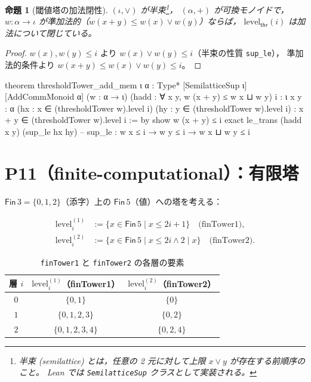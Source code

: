 \documentclass[a4paper,11pt]{ltjsarticle}
\theoremstyle{definition}
\theoremstyle{plain}
\newtheorem{proposition}[definition]{命題}
\theoremstyle{remark}
\newcommand{\lev}{\mathrm{level}}
\begin{document}
\begin{proposition}[閾値塔の加法閉性]\label{prop:threshold-add}
$(\iota, \vee)$ が半束\footnote{%
  半束 (semilattice) とは，任意の 2 元に対して上限 $x \vee y$ が存在する前順序のこと。
  Lean では \texttt{SemilatticeSup} クラスとして実装される。}，
$(\alpha, +)$ が可換モノイドで，
$w : \alpha \to \iota$ が準加法的（$w(x+y) \leq w(x) \vee w(y)$）ならば，
$\lev_{\mathsf{thr}}(i)$ は加法について閉じている。
\end{proposition}
\begin{proof}
$w(x), w(y) \leq i$ より $w(x) \vee w(y) \leq i$（半束の性質 \texttt{sup\_le}），
準加法的条件より $w(x+y) \leq w(x) \vee w(y) \leq i$。
\end{proof}

\begin{leancode}[caption={thresholdTower\_add\_mem の証明（P10: schema）}]
theorem thresholdTower_add_mem {ι α : Type*} [SemilatticeSup ι] [AddCommMonoid α]
    (w : α → ι)
    (hadd : ∀ x y, w (x + y) ≤ w x ⊔ w y)
    {i : ι} {x y : α}
    (hx : x ∈ (thresholdTower w).level i)
    (hy : y ∈ (thresholdTower w).level i) :
    x + y ∈ (thresholdTower w).level i := by
  show w (x + y) ≤ i
  exact le_trans (hadd x y) (sup_le hx hy)
  -- sup_le : w x ≤ i → w y ≤ i → w x ⊔ w y ≤ i
\end{leancode}

\section{P11（finite-computational）：有限塔}\label{sec:finite}

$\mathsf{Fin}\,3 = \{0, 1, 2\}$（添字）上の $\mathsf{Fin}\,5$（値）への塔を考える：

\begin{align*}
  \lev^{(1)}_i &:= \{x \in \mathsf{Fin}\,5 \mid x \leq 2i+1\} \quad \text{(finTower1)}, \\
  \lev^{(2)}_i &:= \{x \in \mathsf{Fin}\,5 \mid x \leq 2i \wedge 2 \mid x\} \quad \text{(finTower2)}.
\end{align*}

\begin{table}[H]
\centering
\caption{\texttt{finTower1} と \texttt{finTower2} の各層の要素}\label{tab:fintowers}
\begin{tabular}{c|c|c}
\toprule
層 $i$ & $\lev^{(1)}_i$（finTower1） & $\lev^{(2)}_i$（finTower2） \\
\midrule
$0$ & $\{0, 1\}$       & $\{0\}$ \\
$1$ & $\{0, 1, 2, 3\}$ & $\{0, 2\}$ \\
$2$ & $\{0,1,2,3,4\}$  & $\{0, 2, 4\}$ \\
\bottomrule
\end{tabular}
\end{table}
\end{document}
